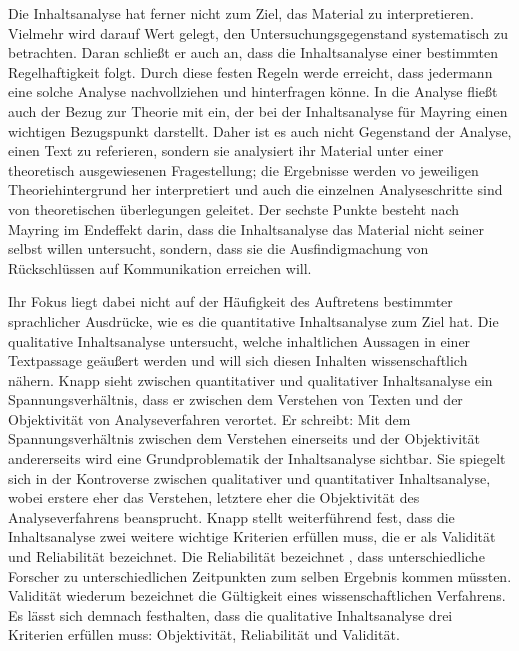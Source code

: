 Die Inhaltsanalyse hat ferner nicht zum Ziel, das Material zu interpretieren. 
Vielmehr wird darauf Wert gelegt, den Untersuchungsgegenstand systematisch zu betrachten. 
Daran schließt er auch an, dass die Inhaltsanalyse einer bestimmten Regelhaftigkeit folgt. 
Durch diese festen Regeln werde erreicht, dass jedermann eine solche Analyse nachvollziehen und hinterfragen könne. 
In die Analyse fließt auch der Bezug zur Theorie mit ein, der bei der Inhaltsanalyse für Mayring einen wichtigen Bezugspunkt darstellt. 
Daher ist es auch nicht Gegenstand der Analyse, einen Text zu referieren, sondern sie \glqq analysiert ihr Material unter einer theoretisch ausgewiesenen Fragestellung; die Ergebnisse werden vo jeweiligen Theoriehintergrund her interpretiert und auch die einzelnen Analyseschritte sind von theoretischen überlegungen geleitet.\grqq{}\cite[S.\,12]{PM07}
 Der sechste Punkte besteht nach Mayring im Endeffekt darin, dass die Inhaltsanalyse das Material nicht seiner selbst willen untersucht, sondern, dass sie die Ausfindigmachung von Rückschlüssen auf Kommunikation erreichen will. 
 
Ihr Fokus liegt dabei nicht auf der Häufigkeit des Auftretens bestimmter sprachlicher Ausdrücke, wie es die quantitative Inhaltsanalyse zum Ziel hat. 
Die qualitative Inhaltsanalyse untersucht, welche inhaltlichen Aussagen in einer Textpassage geäußert werden und will sich diesen Inhalten wissenschaftlich nähern. 
Knapp sieht zwischen quantitativer und qualitativer Inhaltsanalyse ein Spannungsverhältnis, dass er zwischen dem Verstehen von Texten und der Objektivität von Analyseverfahren verortet. 
Er schreibt: \glqq Mit dem Spannungsverhältnis zwischen dem Verstehen einerseits und der Objektivität andererseits wird eine Grundproblematik der Inhaltsanalyse sichtbar. 
Sie spiegelt sich in der Kontroverse zwischen qualitativer und quantitativer Inhaltsanalyse, wobei erstere eher das Verstehen, letztere eher die Objektivität des Analyseverfahrens beansprucht.\grqq{}\cite[S.\,20f]{WK07}
Knapp stellt weiterführend fest, dass die Inhaltsanalyse zwei weitere wichtige Kriterien erfüllen muss, die er als Validität und Reliabilität bezeichnet. 
Die Reliabilität bezeichnet , dass unterschiedliche Forscher zu unterschiedlichen Zeitpunkten zum selben Ergebnis kommen müssten. 
Validität wiederum bezeichnet die Gültigkeit eines wissenschaftlichen Verfahrens. 
Es lässt sich demnach festhalten, dass die qualitative Inhaltsanalyse drei Kriterien erfüllen muss: Objektivität, Reliabilität und Validität.

